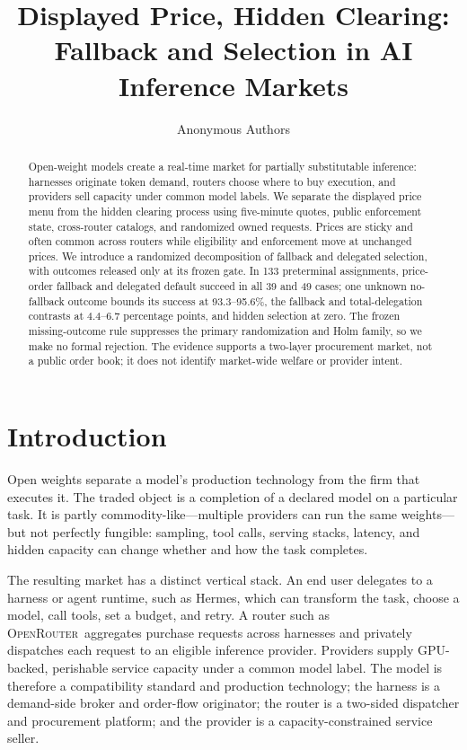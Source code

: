 \documentclass[11pt]{article}
\title{Displayed Price, Hidden Clearing:\\
Fallback and Selection in AI Inference Markets}
\author{Anonymous Authors}
\date{}
\newcommand{\1}{\mathbf{1}}
\newcommand{\OR}{\textsc{OpenRouter}}
\begin{document}
\maketitle

\begin{abstract}
Open-weight models create a real-time market for partially substitutable
inference: harnesses originate token demand, routers choose where to buy
execution, and providers sell capacity under common model labels.  We separate
the displayed price menu from the hidden clearing process using five-minute
quotes, public enforcement state, cross-router catalogs, and randomized owned
requests.  Prices are sticky and often common across routers while eligibility
and enforcement move at unchanged prices.  We introduce a randomized
decomposition of fallback and delegated selection, with outcomes released only
at its frozen gate.  In 133 preterminal assignments, price-order fallback and
delegated default succeed in all 39 and 49 cases; one unknown no-fallback outcome
bounds its success at 93.3--95.6\%, the fallback and total-delegation contrasts
at 4.4--6.7 percentage points, and hidden selection at zero.  The frozen
missing-outcome rule suppresses the primary randomization and Holm family, so we
make no formal rejection.  The evidence supports a two-layer procurement
market, not a public order book; it does not identify market-wide welfare or
provider intent.
\end{abstract}

\section{Introduction}

Open weights separate a model's production technology from the firm that executes
it.  The traded object is a completion of a declared model on a particular task.
It is partly commodity-like---multiple providers can run the same weights---but
not perfectly fungible: sampling, tool calls, serving stacks, latency, and hidden
capacity can change whether and how the task completes.

The resulting market has a distinct vertical stack.  An end user delegates to a
harness or agent runtime, such as Hermes, which can transform the task, choose a
model, call tools, set a budget, and retry.  A router such as \OR\ aggregates
purchase requests across harnesses and privately dispatches each request to an
eligible inference provider.  Providers supply GPU-backed, perishable service
capacity under a common model label.  The model is therefore a compatibility
standard and production technology; the harness is a demand-side broker and
order-flow originator; the router is a two-sided dispatcher and procurement
platform; and the provider is a capacity-constrained service seller.
\end{document}
